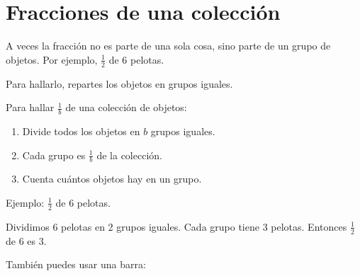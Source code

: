 \section{Fracciones de una colección}

A veces la fracción no es parte de una sola cosa, sino parte de un grupo de objetos. Por ejemplo, $\frac{1}{2}$ de 6 pelotas.

Para hallarlo, repartes los objetos en grupos iguales.

\begin{wbidea}
Para hallar $\frac{1}{b}$ de una colección de objetos:
\begin{enumerate}
\item Divide todos los objetos en $b$ grupos iguales.
\item Cada grupo es $\frac{1}{b}$ de la colección.
\item Cuenta cuántos objetos hay en un grupo.
\end{enumerate}
\end{wbidea}

Ejemplo: $\frac{1}{2}$ de 6 pelotas.

\begin{center}
\end{center}

Dividimos 6 pelotas en 2 grupos iguales. Cada grupo tiene 3 pelotas. Entonces $\frac{1}{2}$ de 6 es $3$.

También puedes usar una barra:

\begin{center}
\end{center}

